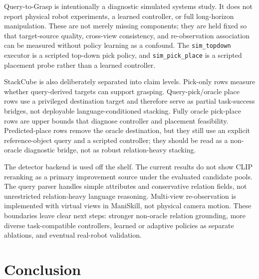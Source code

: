\documentclass[conference]{IEEEtran}
\begin{document}
Query-to-Grasp is intentionally a diagnostic simulated systems study. It does
not report physical robot experiments, a learned controller, or full long-horizon
manipulation. These are not merely missing components; they are held fixed so
that target-source quality, cross-view consistency, and re-observation
association can be measured without policy learning as a confound. The
\texttt{sim\_topdown} executor is a scripted top-down pick policy, and
\texttt{sim\_pick\_place} is a scripted placement probe rather than a learned
controller.

StackCube is also deliberately separated into claim levels. Pick-only rows
measure whether query-derived targets can support grasping. Query-pick/oracle
place rows use a privileged destination target and therefore serve as partial
task-success bridges, not deployable language-conditioned stacking. Fully
oracle pick-place rows are upper bounds that diagnose controller and placement
feasibility. Predicted-place rows remove the oracle destination, but they still
use an explicit reference-object query and a scripted controller; they should be
read as a non-oracle diagnostic bridge, not as robust relation-heavy stacking.

The detector backend is used off the shelf. The current results do not show
CLIP reranking as a primary improvement source under the evaluated candidate
pools. The query parser handles simple attributes and conservative relation
fields, not unrestricted relation-heavy language reasoning. Multi-view
re-observation is implemented with virtual views in ManiSkill, not physical
camera motion. These boundaries leave clear next steps: stronger non-oracle
relation grounding, more diverse task-compatible controllers, learned or
adaptive policies as separate ablations, and eventual real-robot validation.

\section{Conclusion}
\end{document}
